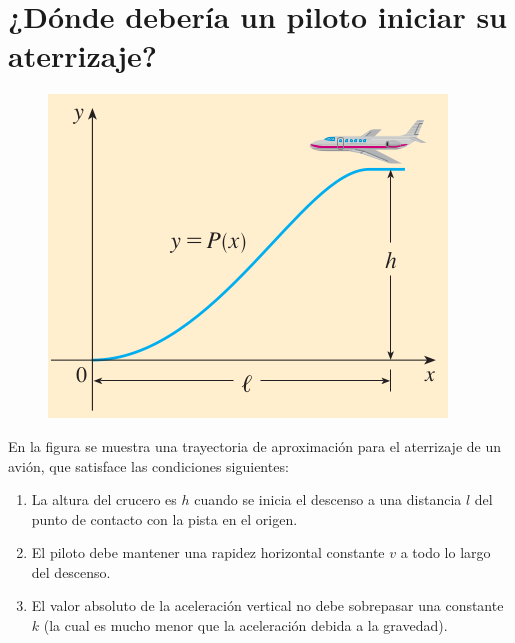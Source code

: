 \chapter*{¿Dónde debería un piloto iniciar su aterrizaje?}
\begin{figure}
	\includegraphics[height = 0.25\textheight]{recursos/Captura desde 2024-09-21 16-53-03.png}
\end{figure}
\noindent
En la figura se muestra una trayectoria de aproximación para el aterrizaje de un avión, que satisface las condiciones siguientes:

\begin{enumerate}[label=\Roman*)]
	\item La altura del crucero es $h$ cuando se inicia el descenso a una distancia $l$ del punto de contacto con la pista en el origen.
	\item El piloto debe mantener una rapidez horizontal constante $v$ a todo lo largo del descenso.
	\item El valor absoluto de la aceleración vertical no debe sobrepasar una constante $k$ (la cual es mucho menor que la aceleración debida a la gravedad).
\end{enumerate}